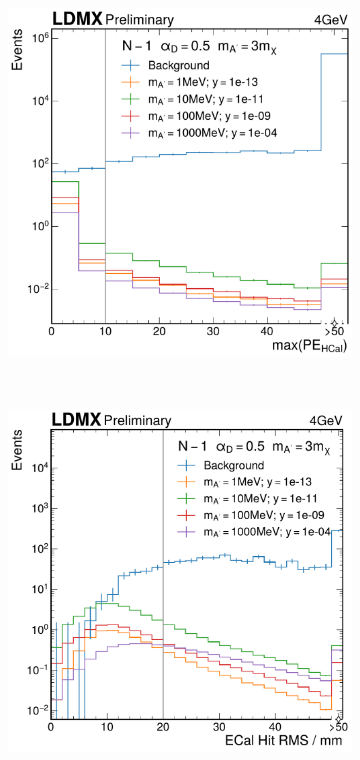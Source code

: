 \begin{figure}
    \centering
    \begin{subfigure}{0.48\textwidth}
      \includegraphics[width=\textwidth]{figures/ldmx/analysis/nm1-hcal-max-pe-4gev-1e13norm.pdf}
    \end{subfigure}
    ~
    \begin{subfigure}{0.48\textwidth}
      \includegraphics[width=\textwidth]{figures/ldmx/analysis/nm1-ecal-rms-4gev-1e13norm.pdf}

\end{subfigure}
\end{figure}
